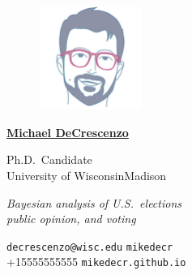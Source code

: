 \documentclass[10pt, oneside, final]{article}
\begin{document}
  \thispagestyle{empty}
  
  \begin{figure}
  \includegraphics[width = 0.3\textwidth]{img/circular-telles.png}
  \end{figure}

  \underline{\large\textsf{\textbf{Michael DeCrescenzo}}}

  {Ph.D.\ Candidate} \\
  {University of Wisconsin{\textendash}Madison}

  \emph{Bayesian analysis of U.S.\ elections \\ public opinion, and voting}

  \vfill 
  {\faEnvelope} \texttt{decrescenzo@wisc.edu} \hfill 
  {\faGithub} \texttt{mikedecr} \\
  {\faPhone} +1{\textendash}555{\textendash}555{\textendash}5555 \hfill 
  {\faGlobe} \texttt{mikedecr.github.io}
  
\end{document}
